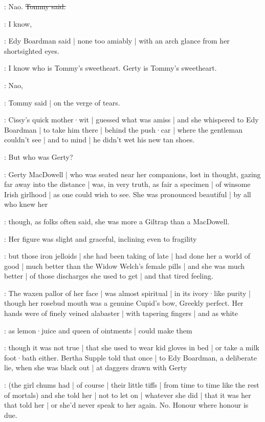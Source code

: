 \tommy:
Nao.
\sout{Tommy said.}

\edy:
I know,

:
Edy Boardman said |
none too amiably |
with an arch glance from her shortsighted eyes.

\edy:
I know who is Tommy's sweetheart.
Gerty is Tommy's sweetheart.

\tommy:
Nao,

:
Tommy said |
on the verge of tears.

:
Cissy's quick mother·wit |
guessed what was amiss |
and she whispered to Edy Boardman |
to take him there |
behind the push·car |
where the gentleman couldn't see |
and to mind |
he didn't wet his new tan shoes.

:
But who was Gerty?

\gertyNovel:
Gerty MacDowell |
who was seated near her companions,
lost in thought,
gazing far away into the distance |
was,%
in very truth,
as fair a specimen |
of winsome Irish girlhood |
as one could wish to see.
She was pronounced beautiful |
by all who knew her

\gertyReal:
though,
as folks often said,
she was more a Giltrap than a MacDowell.

\gertyNovel:
Her figure was slight and graceful,
inclining even to fragility

\gertyReal:
but those iron jelloids |
she had been taking of late |
had done her a world of good |
much better than the Widow Welch's female pills |
and she was much better |
of those discharges she used to get |
and that tired feeling.

\gertyNovel:
The waxen pallor of her face |
was almost spiritual |
in its ivory·like purity |
though her rosebud mouth was a genuine Cupid's bow,
Greekly perfect.
Her hands were of finely veined alabaster |
with tapering fingers |
and
as white

\gertyReal:
as lemon·juice
and queen of ointments |
could make them

\gertyJudgy:
though it was not true |
that she used to wear kid gloves in bed |
or take a milk foot·bath either.
Bertha Supple told that once |
to Edy Boardman,
a deliberate lie,
when she was black out |
at daggers drawn with Gerty

:
(the girl chums had |
of course |
their little tiffs |
from time to time
like the rest of mortals)
and she told her |
not to let on |
whatever she did |
that it was her that told her |
or she'd never speak to her again.
No.
Honour where honour is due.

